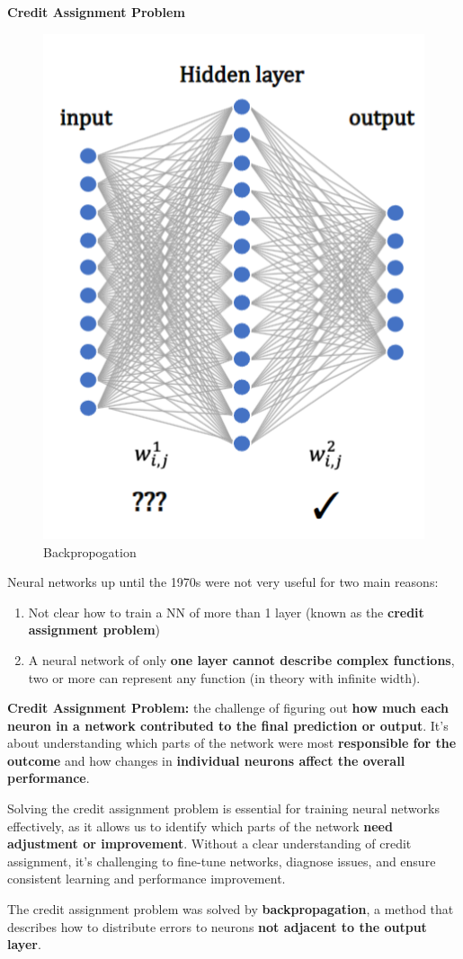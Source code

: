 \noindent\textbf{Credit Assignment Problem}\\
\begin{figure}[h!t]
    \centering
    \includegraphics[width=0.3\linewidth]{creditassignment.png}
    \caption{Backpropogation}
    \label{fig:enter-label}
\end{figure}
Neural networks up until the 1970s were not very useful for two main reasons:
\begin{enumerate}
    \item Not clear how to train a NN of more than 1 layer (known as the \textbf{credit assignment problem})
    \item A neural network of only \textbf{one layer cannot describe complex functions}, two or more can represent any function (in theory with infinite width).
\end{enumerate}
\begin{definition}
    \textbf{Credit Assignment Problem:} the challenge of figuring out \textbf{how much each neuron in a network contributed to the final prediction or output}. It's about understanding which parts of the network were most \textbf{responsible for the outcome} and how changes in \textbf{individual neurons affect the overall performance}. 
\end{definition}

\begin{idea}
    Solving the credit assignment problem is essential for training neural networks effectively, as it allows us to identify which parts of the network \textbf{need adjustment or improvement}. Without a clear understanding of credit assignment, it's challenging to fine-tune networks, diagnose issues, and ensure consistent learning and performance improvement.
\end{idea}

The credit assignment problem was solved by \textbf{backpropagation}, a method that describes how to distribute errors to neurons \textbf{not adjacent to the output layer}.

